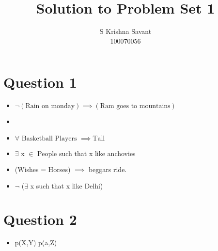 \documentclass{article}
\begin{document}
\title{Solution to Problem Set 1}
\author{S Krishna Savant \\ 100070056}
\maketitle

\section{Question 1}
\begin{comment}
1. Convert the following sentences into predicate calculas:
If it does not rain on Monday, Ram will go to the mountains
Cute is a good cat.
All basketball players are tall.
Some people like anchovies.
If wishes are horses, beggars would ride.
Nobody likes Delhi.
\end{comment}

\begin{itemize}
    \item $\neg (\text{Rain on monday}) \implies (\text{Ram goes to mountains})$
    \item {}
    \item $ \forall \text{ Basketball Players } \implies  \text{Tall}$
    \item $\exists$ x $\in$ People such that x like anchovies
    \item (Wishes = Horses) $\implies$ beggars ride.
    \item $\neg$ ($\exists$ x such that x like Delhi)
\end{itemize}

\section{Question 2}
\begin{comment}
Attempt to unify the following pairs of expressions either with their most general unifiers or explain
why they will not unify:
p(X,Y) and p(a,Z)
p(X,X) and p(a,b)
Ancestor(X,Y) and Ancestor(x,Father(x))
Ancestor(X,Father(X)) and Ancestor(Ram,Sita)
q(X) and ¬q(a)
\end{comment}

\begin{itemize}
    \item p(X,Y) p(a,Z)
\end{itemize}
\end{document}
